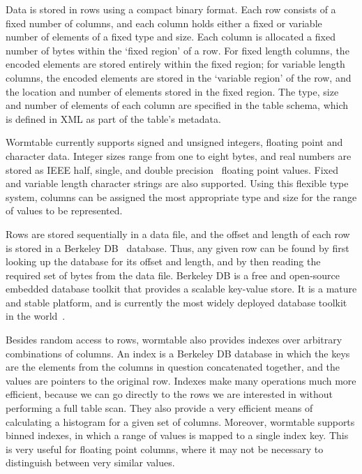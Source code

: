 \documentclass[10pt]{bmc_article}
\newenvironment{bmcformat}{\begin{raggedright}\baselineskip20pt\sloppy\setboolean{publ}{false}}{\end{raggedright}\baselineskip20pt\sloppy}
\begin{document}
\begin{bmcformat}
Data is stored in rows using a compact binary format.
Each row consists of a fixed number of columns, and each column 
holds either a fixed or variable number of elements of a fixed type and size.
Each column is allocated a fixed number of bytes within the `fixed region' of 
a row. For fixed
length columns, the encoded elements are stored entirely within the
fixed region; for variable length columns, the encoded elements are 
stored in the `variable region' of the row, and the location and number 
of elements stored in the fixed region. The type, size and number 
of elements of 
each column are specified in the table schema, which is defined 
in XML as part of the table's metadata.

Wormtable currently supports signed and unsigned integers, 
floating point and character data. Integer sizes range 
from one to eight bytes, and real numbers are stored as 
IEEE half, single, and double precision~\cite{ieee08}
floating point values.  
Fixed and variable length character strings 
are also supported. Using this flexible type system, columns can 
be assigned the most appropriate type and size for the range of
values to be represented.

Rows are stored sequentially in a data file, and the offset and length 
of each row is stored in a Berkeley DB~\cite{obs99} database. 
Thus, any given row can be found 
by first looking up the database for its offset and length, and by then reading
the required set of bytes from the data file. 
Berkeley DB is a free and open-source embedded database toolkit that provides a
scalable key-value store. It is a mature and stable platform, 
and is currently the most widely deployed database toolkit in the 
world~\cite{sb12}. 

Besides random access to rows, wormtable also provides indexes
over arbitrary combinations of columns. An index is a 
Berkeley DB database in 
which the keys are the elements from the columns in question concatenated
together, and the values are pointers to the original row. Indexes make
many operations much more efficient, because we can go directly to the 
rows we are interested in without performing a full table scan. They also 
provide a very efficient means of calculating a histogram for a given 
set of columns. Moreover, wormtable supports binned indexes, in which a range of 
values is mapped to a single index key. This is very useful for floating 
point columns, where it may not be necessary to distinguish between
very similar values.


\end{bmcformat}
\end{document}
